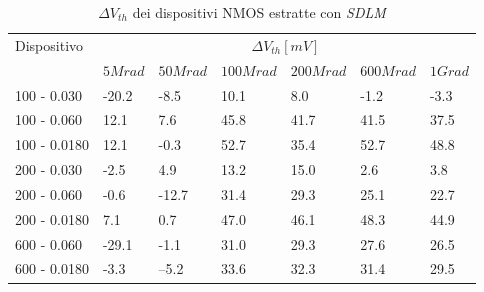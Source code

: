 \begin{table}[H]
  \renewcommand{\arraystretch}{1.3}
  \begin{tabular}{m{2.1cm}  m{1.1cm} m{1.3cm} m{1.5cm} m{1.5cm} m{1.5cm} m{1cm}}
    \toprule
    \multirow{2}{*}{Dispositivo} & \multicolumn{6}{c}{$\Delta V_{th} [mV] $}                                                          \\
    \cmidrule{2-7}
                                 & $5Mrad$                                   & $50Mrad$ & $100Mrad$ & $200Mrad$ & $600Mrad$ & $1Grad$ \\
    \midrule
    100 - 0.030                     & -20.2                                     & -8.5     & 10.1      & 8.0       & -1.2      & -3.3        \\
    \hline
    100 - 0.060                     & 12.1                                      & 7.6      & 45.8      & 41.7      & 41.5      & 37.5        \\
    \hline
    100 - 0.0180                    & 12.1                                      & -0.3     & 52.7      & 35.4      & 52.7      & 48.8        \\
    \hline
    200 - 0.030                     & -2.5                                      & 4.9      & 13.2      & 15.0      & 2.6       &  3.8       \\
    \hline
    200 - 0.060                     & -0.6                                      & -12.7    & 31.4      & 29.3      & 25.1      & 22.7        \\
    \hline
    200 - 0.0180                    & 7.1                                       & 0.7      & 47.0      & 46.1      & 48.3      & 44.9        \\
    \hline
    600 - 0.060                     & -29.1                                     & -1.1     & 31.0      & 29.3      & 27.6      & 26.5        \\
    \hline
    600 - 0.0180                    & -3.3                                      & --5.2    & 33.6      & 32.3      & 31.4      & 29.5        \\
    \bottomrule
  \end{tabular}
  \caption{$\Delta V_{th}$ dei dispositivi NMOS estratte con \emph{SDLM}}
  \label{tab:deltaVthSDLMN}
\end{table}

